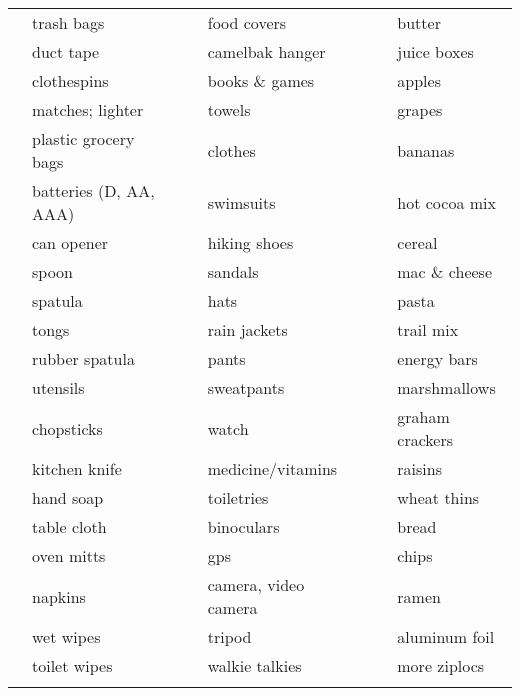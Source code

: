 \documentclass[10pt]{article}
\newcommand{\mybox}{\framebox[4mm]{\textcolor{white} m} \framebox[4mm]{\textcolor{white} m} }
\begin{document}
\begin{tabular}{rlcrlcrl}
\mybox & trash bags             &    &\mybox & food covers          &    &\mybox & butter \\
\mybox & duct tape              &    &\mybox & camelbak hanger      &    &\mybox & juice boxes \\ \cline{4-5}
\mybox & clothespins            &    &\mybox & books \& games       &    &\mybox & apples \\
\mybox & matches; lighter       &    &\mybox & towels               &    &\mybox & grapes \\
\mybox & plastic grocery bags   &    &\mybox & clothes              &    &\mybox & bananas \\ \cline{7-8}
\mybox & batteries (D, AA, AAA) &    &\mybox & swimsuits            &    &\mybox & hot cocoa mix \\ \cline{1-2}
\mybox & can opener             &    &\mybox & hiking shoes         &    &\mybox & cereal \\
\mybox & spoon                  &    &\mybox & sandals              &    &\mybox & mac \& cheese \\
\mybox & spatula                &    &\mybox & hats                 &    &\mybox & pasta \\
\mybox & tongs                  &    &\mybox & rain jackets         &    &\mybox & trail mix \\
\mybox & rubber spatula         &    &\mybox & pants                &    &\mybox & energy bars \\
\mybox & utensils               &    &\mybox & sweatpants           &    &\mybox & marshmallows \\
\mybox & chopsticks             &    &\mybox & watch                &    &\mybox & graham crackers \\
\mybox & kitchen knife          &    &\mybox & medicine/vitamins    &    &\mybox & raisins \\
\mybox & hand soap              &    &\mybox & toiletries           &    &\mybox & wheat thins \\
\mybox & table cloth            &    &\mybox & binoculars           &    &\mybox & bread \\ \cline{4-5}
\mybox & oven mitts             &    &\mybox & gps                  &    &\mybox & chips \\
\mybox & napkins                &    &\mybox & camera, video camera &    &\mybox & ramen \\
\mybox & wet wipes              &    &\mybox & tripod               &    &\mybox & aluminum foil \\
\mybox & toilet wipes           &    &\mybox & walkie talkies       &    &\mybox & more ziplocs \\
\mybox & \hspace{1.5in}         &    &\mybox & \hspace{1.5in}       &    &\mybox & \hspace{1.5in} \\ \hline
\end{tabular}
\end{document}
